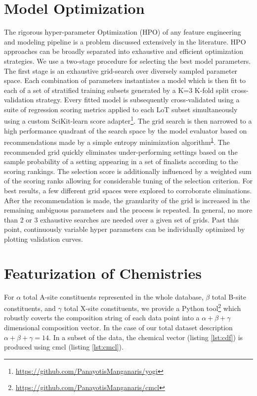 \section{Model Optimization}
\label{sec:org8f9180a}
The rigorous hyper-parameter Optimization (HPO) of any feature engineering and modeling pipeline is a problem discussed extensively in the literature.
HPO approaches can be broadly separated into exhaustive and efficient optimization strategies.
\autocite{yang-2020-hyper-optim}
We use a two-stage procedure for selecting the best model parameters.
The first stage is an exhaustive grid-search over diversely sampled parameter space.
Each combination of parameters instantiates a model which is then fit to each of a set of stratified training subsets generated by a K=3 K-fold split cross-validation strategy.
Every fitted model is subsequently cross-validated using a suite of regression scoring metrics applied to each LoT subset simultaneously using a custom SciKit-learn score adapter\footnote{\url{https://github.com/PanayotisManganaris/yogi}\label{org39fba7e}}.
The grid search is then narrowed to a high performance quadrant of the search space by the model evaluator based on recommendations made by a simple entropy minimization algorithm\textsuperscript{\ref{org39fba7e}}.
The recommended grid quickly eliminates under-performing settings based on the sample probability of a setting appearing in a set of finalists according to the scoring rankings.
The selection score is additionally influenced by a weighted sum of the scoring ranks allowing for considerable tuning of the selection criterion.
For best results, a few different grid spaces were explored to corroborate eliminations.
After the recommendation is made, the granularity of the grid is increased in the remaining ambiguous parameters and the process is repeated.
In general, no more than 2 or 3 exhaustive searches are needed over a given set of grids.
Past this point, continuously variable hyper parameters can be individually optimized by plotting validation curves.

\section{Featurization of Chemistries}
\label{sec:orgd1d9e75}
For \(\alpha\) total A-site constituents represented in the whole database, \(\beta\) total B-site constituents, and \(\gamma\) total X-site constituents, we provide a Python tool\footnote{\url{https://github.com/PanayotisManganaris/cmcl}\label{orge54c147}} which robustly coverts the composition string of each data point into a \(\alpha + \beta + \gamma\) dimensional composition vector.
In the case of our total dataset description \(\alpha + \beta + \gamma = 14\).
\autocite{yang-2022-high-throug}
In a subset of the data, the chemical vector (listing \ref{lst:cdf}) is produced using cmcl (listing \ref{lst:cmcl}).

